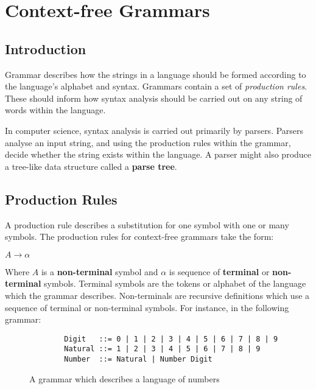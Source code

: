 \section{Context-free Grammars}

\subsection{Introduction}

Grammar describes how the strings in a language should be formed according to the language's alphabet and syntax. Grammars contain a set of \textit{production rules}. These should inform how syntax analysis should be carried out on any string of words within the language.

In computer science, syntax analysis is carried out primarily by parsers. Parsers analyse an input string, and using the production rules within the grammar, decide whether the string exists within the language. A parser might also produce a tree-like data structure called a \textbf{parse tree}.

\subsection{Production Rules}

A production rule describes a substitution for one symbol with one or many symbols\textsuperscript{\cite{scott_johnstone_1998}}. The production rules for context-free grammars take the form:

\begin{center}
    $A \rightarrow \alpha$
\end{center}

Where $A$ is a \textbf{non-terminal} symbol and $\alpha$ is sequence of \textbf{terminal} or \textbf{non-terminal} symbols. Terminal symbols are the tokens or alphabet of the language which the grammar describes. Non-terminals are recursive definitions which use a sequence of terminal or non-terminal symbols\textsuperscript{\cite{barbosa_2018}}. For instance, in the following grammar:

\begin{figure}[h]
    \begin{center}    
        \begin{verbatim}
        Digit   ::= 0 | 1 | 2 | 3 | 4 | 5 | 6 | 7 | 8 | 9
        Natural ::= 1 | 2 | 3 | 4 | 5 | 6 | 7 | 8 | 9
        Number  ::= Natural | Number Digit
        \end{verbatim}
        \vspace{-1.5em}
    \end{center}
    \caption{\label{fig:2.1}A grammar which describes a language of numbers}
\end{figure}

